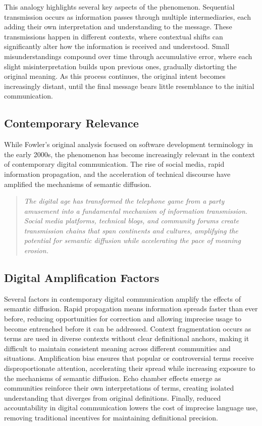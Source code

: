 \documentclass[11pt]{article}
\begin{document}
This analogy highlights several key aspects of the phenomenon. Sequential transmission occurs as information passes through multiple intermediaries, each adding their own interpretation and understanding to the message. These transmissions happen in different contexts, where contextual shifts can significantly alter how the information is received and understood. Small misunderstandings compound over time through accumulative error, where each slight misinterpretation builds upon previous ones, gradually distorting the original meaning. As this process continues, the original intent becomes increasingly distant, until the final message bears little resemblance to the initial communication.

\subsection{Contemporary Relevance}

While Fowler's original analysis focused on software development terminology in the early 2000s, the phenomenon has become increasingly relevant in the context of contemporary digital communication. The rise of social media, rapid information propagation, and the acceleration of technical discourse have amplified the mechanisms of semantic diffusion.

\begin{quote}
\emph{The digital age has transformed the telephone game from a party amusement into a fundamental mechanism of information transmission. Social media platforms, technical blogs, and community forums create transmission chains that span continents and cultures, amplifying the potential for semantic diffusion while accelerating the pace of meaning erosion.}
\end{quote}

\subsection{Digital Amplification Factors}

Several factors in contemporary digital communication amplify the effects of semantic diffusion. Rapid propagation means information spreads faster than ever before, reducing opportunities for correction and allowing imprecise usage to become entrenched before it can be addressed. Context fragmentation occurs as terms are used in diverse contexts without clear definitional anchors, making it difficult to maintain consistent meaning across different communities and situations. Amplification bias ensures that popular or controversial terms receive disproportionate attention, accelerating their spread while increasing exposure to the mechanisms of semantic diffusion. Echo chamber effects emerge as communities reinforce their own interpretations of terms, creating isolated understanding that diverges from original definitions. Finally, reduced accountability in digital communication lowers the cost of imprecise language use, removing traditional incentives for maintaining definitional precision.
\end{document}
